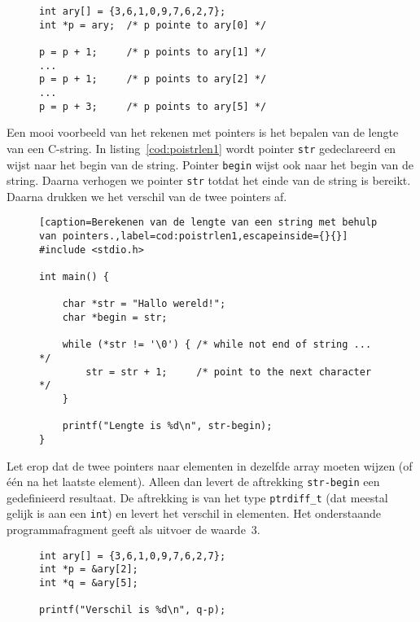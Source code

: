 \begin{figure}[!ht]
\begin{lstlisting}[caption=Rekenen met pointers.]
int ary[] = {3,6,1,0,9,7,6,2,7};
int *p = ary;  /* p pointe to ary[0] */

p = p + 1;     /* p points to ary[1] */
...
p = p + 1;     /* p points to ary[2] */
...
p = p + 3;     /* p points to ary[5] */

\end{lstlisting}
\end{figure}

Een mooi voorbeeld van het rekenen met pointers is het bepalen van de lengte van een C-string. In listing~\ref{cod:poistrlen1} wordt pointer \texttt{str} gedeclareerd en wijst naar het begin van de string. Pointer \texttt{begin} wijst ook naar het begin van de string. Daarna verhogen we pointer \texttt{str} totdat het einde van de string is bereikt. Daarna drukken we het verschil van de twee pointers af.

\begin{figure}[!ht]
\begin{lstlisting}[caption=Berekenen van de lengte van een string met behulp van pointers.,label=cod:poistrlen1,escapeinside={}{}]
#include <stdio.h>

int main() {

    char *str = "Hallo wereld!";
    char *begin = str;

    while (*str != '\0') { /* while not end of string ... */
        str = str + 1;     /* point to the next character */
    }

    printf("Lengte is %d\n", str-begin);
}
\end{lstlisting}
\end{figure}

Let erop dat de twee pointers naar elementen in dezelfde array moeten wijzen (of één na het laatste element). Alleen dan levert de aftrekking \texttt{str-begin} een gedefinieerd resultaat. De aftrekking is van het type \texttt{ptrdiff\_t} (dat meestal gelijk is aan een \texttt{int}) en levert het verschil in elementen. Het onderstaande programmafragment geeft als uitvoer de waarde~3.

\begin{figure}[!ht]
\begin{lstlisting}[caption=Het berekenen van het verschil van twee pointers.]
int ary[] = {3,6,1,0,9,7,6,2,7};
int *p = &ary[2];
int *q = &ary[5];

printf("Verschil is %d\n", q-p);
\end{lstlisting}
\end{figure}

